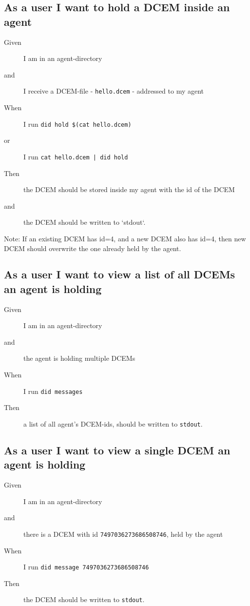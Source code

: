 \subsection{As a user I want to hold a DCEM inside an agent}
\begin{description}\begin{description}
    \item[Given] I am in an agent-directory
    \item[and] I receive a DCEM-file - \texttt{hello.dcem} - addressed to my agent
    \item[When] I run \texttt{did hold \$(cat hello.dcem)} 
    \item[or] I run \texttt{cat hello.dcem | did hold}
    \item[Then] the DCEM should be stored inside my agent with the id of the DCEM
    \item[and] the DCEM should be written to `stdout`.
\end{description}\end{description}

Note: If an existing DCEM has id=4, and a new DCEM also has id=4, then new DCEM should overwrite the one already held by the agent.



\subsection{As a user I want to view a list of all DCEMs an agent is holding}
\begin{description}\begin{description}
    \item[Given] I am in an agent-directory
    \item[and] the agent is holding multiple DCEMs
    \item[When] I run \texttt{did messages}
    \item[Then] a list of all agent's DCEM-ids, should be written to \texttt{stdout}.
\end{description}\end{description}



\subsection{As a user I want to view a single DCEM an agent is holding}
\begin{description}\begin{description}
    \item[Given] I am in an agent-directory
    \item[and] there is a DCEM with id \texttt{7497036273686508746}, held by the agent
    \item[When] I run \texttt{did message 7497036273686508746}
    \item[Then] the DCEM should be written to \texttt{stdout}.
\end{description}\end{description}




